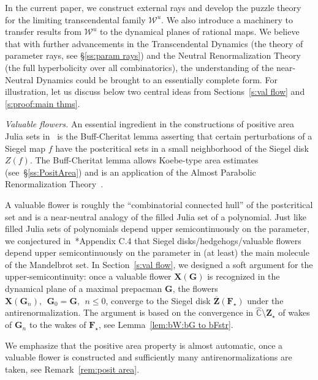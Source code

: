 \documentclass{amsart}
\renewcommand{\sp}{{\ \ }}
\newcommand{\1}{{\mathbb 1 }}
\newcommand{\bF}{{\mathbf F}}
\newcommand{\bZ}{{\mathbf Z}}
\newcommand{\bX}{{\mathbf X}}
\newcommand{\bG}{{\mathbf G}}
\newcommand{\str}{{\star}}
\newcommand\WW{\mathcal{W}}
\newcommand{\wC}{\widehat{\mathbb{C}}}
\theoremstyle{remark}
\numberwithin{equation}{section}
\theoremstyle{definition}
\theoremstyle{nonumberbreak}
\begin{document}
In the current paper, we construct external rays and develop the puzzle theory for the limiting transcendental family $\WW^u$. We also introduce a machinery to transfer results from $\WW^u$ to the dynamical planes of rational maps.  We believe that with further advancements in the Transcendental Dynamics (the theory of parameter rays, see \S\ref{ss:param rays}) and the Neutral Renormalization Theory (the full hyperbolicity over all combinatorics), the understanding of the near-Neutral Dynamics could be brought to an essentially complete form. For illustration, let us discuss below two central ideas from Sections~\ref{s:val flow} and \ref{s:proof:main thms}. 




\emph{Valuable flowers.} An essential ingredient in the constructions of positive area Julia sets in~\cites{BC, AL-posmeas} is the Buff-Cheritat lemma asserting that certain perturbations of a Siegel map $f$ have the postcritical sets in a small neighborhood of the Siegel disk $Z(f)$. The Buff-Cheritat lemma allows Koebe-type area estimates (see~\S\ref{ss:PositArea}) and is an application of the Almost Parabolic Renormalization Theory~\cite{IS}. 

A valuable flower is roughly the ``combinatorial connected hull'' of the postcritical set and is a near-neutral analogy of the filled Julia set of a polynomial. Just like filled Julia sets of polynomials depend upper semicontinuously on the parameter, we conjectured in~\cite{DLS}*{Appendix C.4} that Siegel disks/hedgehogs/valuable flowers depend upper semicontinuously on the parameter in (at least) the main molecule of the Mandelbrot set. In  Section~\ref{s:val flow}, we designed a soft argument for the upper-semicontinuity: once a valuable flower $ \bX(\bG)$ is recognized in the dynamical plane of a maximal prepacman $\bG$, the flowers $ \bX(\bG_n), \sp \bG_0=\bG,\sp n\le 0$, converge to the Siegel disk $\overline \bZ(\bF_\str)$ under the antirenormalization. The argument is based on the convergence in $\wC\setminus \bZ_\str$ of wakes of $\bG_n$ to the wakes of $\bF_\str$, see Lemma~\ref{lem:bW:bG to bFstr}. 


We emphasize that the positive area property is almost automatic, once a valuable flower is constructed and sufficiently many antirenormalizations are taken, see Remark~\ref{rem:posit area}.
\end{document}
